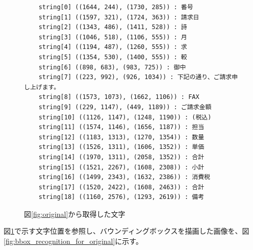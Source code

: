 \lstset{language=}
\begin{figure}[tp]
    \begin{lstlisting}
    string[0] ((1644, 244), (1730, 285)) : 番号
    string[1] ((1597, 321), (1724, 363)) : 請求日
    string[2] ((1343, 486), (1411, 528)) : 詩
    string[3] ((1046, 518), (1106, 555)) : 月
    string[4] ((1194, 487), (1260, 555)) : 求
    string[5] ((1354, 530), (1400, 555)) : 較
    string[6] ((898, 683), (983, 725)) : 御中
    string[7] ((223, 992), (926, 1034)) : 下記の通り、ご請求申し上げます。
    string[8] ((1573, 1073), (1662, 1106)) : FAX
    string[9] ((229, 1147), (449, 1189)) : ご請求金額
    string[10] ((1126, 1147), (1248, 1190)) : (税込)
    string[11] ((1574, 1146), (1656, 1187)) : 担当
    string[12] ((1183, 1313), (1270, 1354)) : 数量
    string[13] ((1526, 1311), (1606, 1352)) : 単価
    string[14] ((1970, 1311), (2058, 1352)) : 合計
    string[15] ((1521, 2267), (1608, 2308)) : 小計
    string[16] ((1499, 2343), (1632, 2386)) : 消費税
    string[17] ((1520, 2422), (1608, 2463)) : 合計
    string[18] ((1160, 2576), (1293, 2619)) : 備考
    \end{lstlisting}
    \caption{図\ref{fig:original}から取得した文字}
    \label{fig:char_recognition_for_original}
\end{figure}

図\ref{fig:char_recognition_for_original}で示す文字位置を参照し、バウンディングボックスを描画した画像を、図\ref{fig:bbox_recognition_for_original}に示す。

